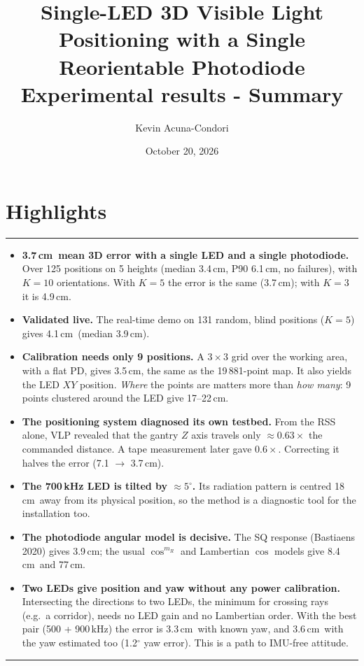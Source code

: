 \documentclass[10.5pt,a4paper]{article}
\title{\vspace{-12mm}\textbf{Single-LED 3D Visible Light Positioning with a Single Reorientable Photodiode}\\[2pt]
\large Experimental results - Summary}
\author{Kevin Acuna-Condori}
\date{October 20, 2026}
\newcommand{\cm}{\,cm}
\begin{document}
\maketitle
\vspace{-6mm}

\section*{Highlights}
\vspace{-2mm}\noindent\rule{\linewidth}{0.4pt}
\begin{itemize}[leftmargin=4mm]
\item \textbf{3.7\cm\ mean 3D error with a single LED and a single photodiode.} Over 125 positions on
  5 heights (median 3.4\cm, P90 6.1\cm, no failures), with $K=10$ orientations. With $K=5$ the error is
  the same (3.7\cm); with $K=3$ it is 4.9\cm.
\item \textbf{Validated live.} The real-time demo on 131 random, blind positions ($K=5$) gives 4.1\cm\
  (median 3.9\cm).
\item \textbf{Calibration needs only 9 positions.} A $3\times3$ grid over the working area, with a flat
  PD, gives 3.5\cm, the same as the 19\,881-point map. It also yields the LED $XY$ position.
  \emph{Where} the points are matters more than \emph{how many}: 9 points clustered around the LED
  give 17--22\cm.
\item \textbf{The positioning system diagnosed its own testbed.} From the RSS alone, VLP revealed that
  the gantry $Z$ axis travels only $\approx 0.63\times$ the commanded distance. A tape measurement
  later gave $0.6\times$. Correcting it halves the error (7.1 $\rightarrow$ 3.7\cm).
\item \textbf{The 700\,kHz LED is tilted by $\approx 5^\circ$.} Its radiation pattern is centred
  18\cm\ away from its physical position, so the method is a diagnostic tool for the installation too.
\item \textbf{The photodiode angular model is decisive.} The SQ response (Bastiaens 2020) gives
  3.9\cm; the usual $\cos^{m_R}$ and Lambertian $\cos$ models give 8.4\cm\ and 77\cm.
\item \textbf{Two LEDs give position and yaw without any power calibration.} Intersecting the
  directions to two LEDs, the minimum for crossing rays (e.g.\ a corridor), needs no LED gain and no
  Lambertian order. With the best pair (500 + 900\,kHz) the error is 3.3\cm\ with known yaw, and
  3.6\cm\ with the yaw estimated too (1.2$^\circ$ yaw error). This is a path to IMU-free attitude.
\end{itemize}
\noindent\rule{\linewidth}{0.4pt}
\end{document}
